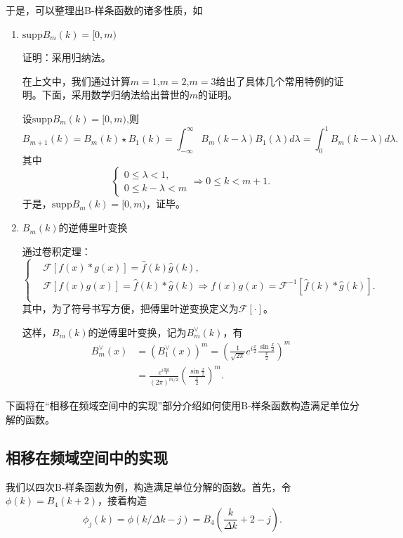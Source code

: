 于是，可以整理出B-样条函数的诸多性质，如
\begin{enumerate}
    \item $\text{supp} B_m(k)=[0,m)$
    
    证明：采用归纳法。

    在上文中，我们通过计算$m=1$,$m=2$,$m=3$给出了具体几个常用特例的证明。下面，采用数学归纳法给出普世的$m$的证明。

    设$\text{supp} B_m(k)=[0,m)$,则
    \begin{equation*}
    B_{m+1}(k)=B_{m}(k)\star B_{1}(k)=\int_{-\infty}^{\infty}B_{m}(k-\lambda)B_{1}(\lambda)d\lambda=
\int_{0}^{1}B_{m}(k-\lambda)d\lambda .
\end{equation*}
其中
\begin{equation*}
    \left\{\begin{matrix} 
0 \le \lambda <1,\\
0\le k-\lambda <m
\end{matrix}\right. 
\Rightarrow 0\le k <m+1 .
\end{equation*}
于是，$\text{supp} B_m(k)=[0,m)$，证毕。
    \item $B_m(k)$的逆傅里叶变换
    
    通过卷积定理：
    \begin{equation}
        \left\{\begin{matrix} 
& \mathcal{F} [f(x)*g(x)]= \hat{f}(k)\hat{g}(k) , \\
& \mathcal{F}[f(x)g(x)] = \hat{f}(k)*\hat{g}(k)\Rightarrow f(x)g(x) = \mathcal{F}^{-1}[\hat{f}(k)*\hat{g}(k)] .\\
\end{matrix}\right. 
    \end{equation}
其中，为了符号书写方便，把傅里叶逆变换定义为$\mathcal{F[\cdot ]}$。

这样，$B_m(k)$的逆傅里叶变换，记为$B_m^{\vee}(k)$，有
\begin{align}
B_{m}^{\vee}(x)  &  =\left(  B_{1}^{\vee}(x)\right)  ^{m}=\left(  \frac
{1}{\sqrt{2\pi}}e^{i\frac{x}{2}}\frac{\sin\frac{x}{2}}{\frac{x}{2}}\right)
^{m}\nonumber\\
&  =\frac{e^{i\frac{mx}{2}}}{\left(  2\pi\right)  ^{m/2}}\left(  \frac
{\sin\frac{x}{2}}{\frac{x}{2}}\right)  ^{m}.
\end{align}
\end{enumerate}
下面将在“相移在频域空间中的实现”部分介绍如何使用B-样条函数构造满足单位分解的函数。


\subsection{相移在频域空间中的实现}
我们以四次B-样条函数为例，构造满足单位分解的函数。首先，令$\phi(k)=B_{4}(k+2)$，接着构造
\begin{equation}
    \phi_j(k)=\phi(k/\Delta k-j)=B_4(\frac{k}{\Delta k}+2-j) .
\end{equation}

